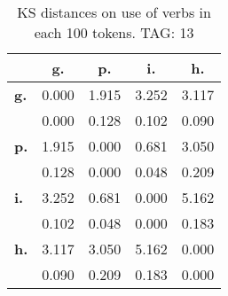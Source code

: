 \begin{table}[h!]
\begin{center}
\begin{tabular}{| l || c | c | c | c |}\hline
 & {\bf g.} & {\bf p.} & {\bf i.} & {\bf h.} \\\hline\hline
{\bf g.} & 0.000 & 1.915 & 3.252 & 3.117 \\
{\bf } & 0.000 & 0.128 & 0.102 & 0.090 \\\hline
{\bf p.} & 1.915 & 0.000 & 0.681 & 3.050 \\
{\bf } & 0.128 & 0.000 & 0.048 & 0.209 \\\hline
{\bf i.} & 3.252 & 0.681 & 0.000 & 5.162 \\
{\bf } & 0.102 & 0.048 & 0.000 & 0.183 \\\hline
{\bf h.} & 3.117 & 3.050 & 5.162 & 0.000 \\
{\bf } & 0.090 & 0.209 & 0.183 & 0.000 \\\hline
\end{tabular}
\caption{KS distances on use of verbs in each 100 tokens. TAG: 13}
\end{center}
\end{table}